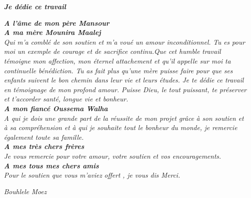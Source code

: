 \begin{center}
\textit{\textsl{ \textbf{Je dédie ce travail} } }
\end{center}
\begin{center}
\textsl{
 \textbf{A l'âme de mon père Mansour}
 \\[0.2in]
 \textbf{A ma mère Mounira Maalej}\\
 Qui m'a comblé de son soutien et m'a
voué un amour inconditionnel. Tu es pour moi un exemple de
courage et de sacrifice continu.Que cet humble travail témoigne
mon affection, mon éternel attachement et qu'il appelle sur moi
ta continuelle bénédiction. Tu as fait plus qu’une mère puisse faire pour que ses
enfants suivent le bon chemin dans leur vie et leurs études.
Je te dédie ce travail en témoignage de mon profond
amour. Puisse Dieu, le tout puissant, te préserver et
t’accorder santé, longue vie et bonheur.
\\[0.2in]
\textbf{A mon fiancé Oussema Walha}\\
A qui je dois une grande part de la réussite de mon projet grâce à
son soutien et à sa compréhension et à qui je souhaite tout le bonheur du monde,
je remercie également toute sa famille.
\\[0.2in]
\textbf{A mes très chers frères}\\
Je vous remercie pour votre amour,
votre soutien et vos encouragements.
\\[0.2in]
\textbf{A mes tous mes chers amis}\\
Pour le soutien que vous m'aviez
offert , je vous dis Merci.}
\begin{flushright}
 \textit{\emph {Bouhlele Moez}}
\end{flushright}

\end{center}